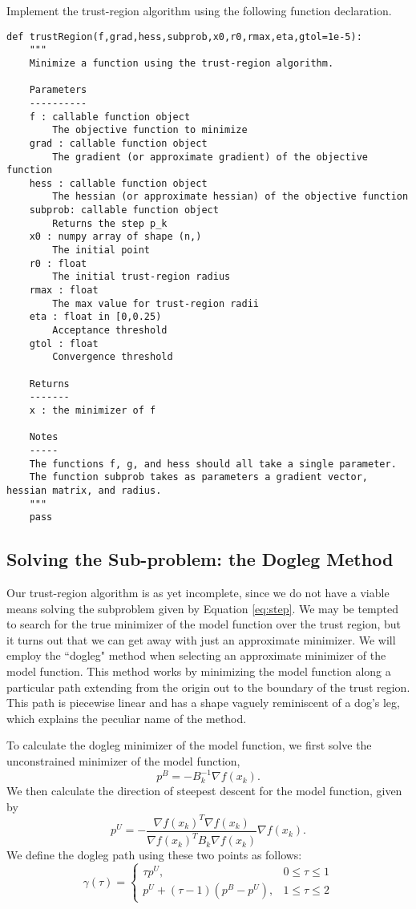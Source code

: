 \begin{problem}
Implement the trust-region algorithm using the following function declaration.
\begin{lstlisting}
def trustRegion(f,grad,hess,subprob,x0,r0,rmax,eta,gtol=1e-5):
    """
    Minimize a function using the trust-region algorithm.

    Parameters
    ----------
    f : callable function object
        The objective function to minimize
    grad : callable function object
        The gradient (or approximate gradient) of the objective function
    hess : callable function object
        The hessian (or approximate hessian) of the objective function
    subprob: callable function object
        Returns the step p_k
    x0 : numpy array of shape (n,)
        The initial point
    r0 : float
        The initial trust-region radius
    rmax : float
        The max value for trust-region radii
    eta : float in [0,0.25)
        Acceptance threshold
    gtol : float
        Convergence threshold

    Returns
    -------
    x : the minimizer of f

    Notes
    -----
    The functions f, g, and hess should all take a single parameter.
    The function subprob takes as parameters a gradient vector, hessian matrix, and radius.
    """
    pass
\end{lstlisting}
\end{problem}

\subsection*{Solving the Sub-problem: the Dogleg Method}
Our trust-region algorithm is as yet incomplete, since we do not have a viable means solving the subproblem
given by Equation \ref{eq:step}.
We may be tempted to search for the true minimizer of the model function over the trust region, but it turns out
that we can get away with just an approximate minimizer.
We will employ the ``dogleg" method when selecting an approximate minimizer of the model function.
This method works by minimizing the model function along a particular path extending from the origin out
to the boundary of the trust region.
This path is piecewise linear and has a shape vaguely reminiscent of a dog's leg, which explains the peculiar name of the method.

To calculate the dogleg minimizer of the model function, we first solve the unconstrained minimizer of the model function,
\[
p^B = -B_k^{-1}\nabla f(x_k).
\]
We then calculate the direction of steepest descent for the model function, given by
\[
p^U = -\frac{\nabla f(x_k)^T\nabla f(x_k)}{\nabla f(x_k)^TB_k\nabla f(x_k)}\nabla f(x_k).
\]
We define the dogleg path using these two points as follows:
\[
\gamma(\tau) =  \left\{
     \begin{array}{lr}
       \tau p^U, & 0\leq \tau \leq 1\\
       p^U+(\tau-1)(p^B-p^U), & 1\leq \tau\leq 2
     \end{array}
   \right.
\]

